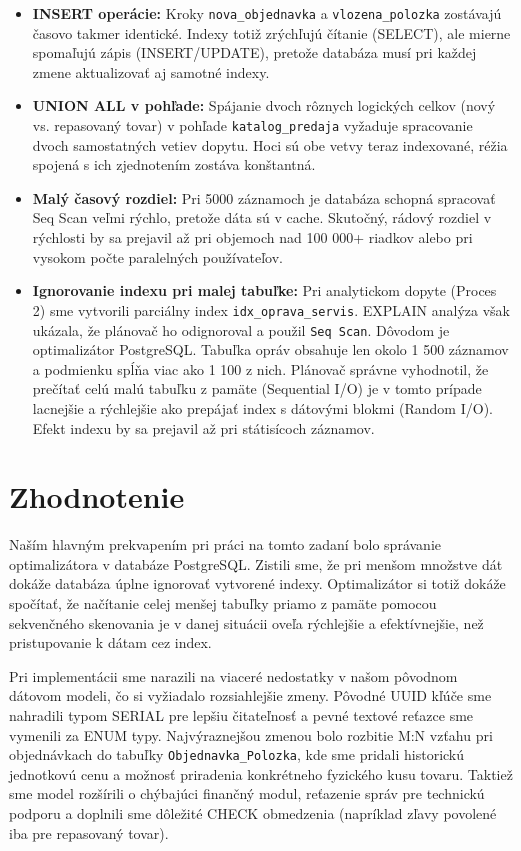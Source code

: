 \documentclass[11pt, a4paper]{article}
\begin{document}
\begin{itemize}
        \item \textbf{INSERT operácie:} Kroky \texttt{nova\_objednavka} a \texttt{vlozena\_polozka} zostávajú časovo takmer identické. Indexy totiž zrýchľujú čítanie (SELECT), ale mierne spomaľujú zápis (INSERT/UPDATE), pretože databáza musí pri každej zmene aktualizovať aj samotné indexy.
        \item \textbf{UNION ALL v pohľade:} Spájanie dvoch rôznych logických celkov (nový vs. repasovaný tovar) v pohľade \texttt{katalog\_predaja} vyžaduje spracovanie dvoch samostatných vetiev dopytu. Hoci sú obe vetvy teraz indexované, réžia spojená s ich zjednotením zostáva konštantná.
        \item \textbf{Malý časový rozdiel:} Pri 5000 záznamoch je databáza schopná spracovať Seq Scan veľmi rýchlo, pretože dáta sú v cache. Skutočný, rádový rozdiel v rýchlosti by sa prejavil až pri objemoch nad 100 000+ riadkov alebo pri vysokom počte paralelných používateľov.
        \item \textbf{Ignorovanie indexu pri malej tabuľke:} Pri analytickom dopyte (Proces 2) sme vytvorili parciálny index \texttt{idx\_oprava\_servis}. EXPLAIN analýza však ukázala, že plánovač ho odignoroval a použil \texttt{Seq Scan}. Dôvodom je optimalizátor PostgreSQL. Tabuľka opráv obsahuje len okolo 1 500 záznamov a podmienku spĺňa viac ako 1 100 z nich. Plánovač správne vyhodnotil, že prečítať celú malú tabuľku z pamäte (Sequential I/O) je v tomto prípade lacnejšie a rýchlejšie ako prepájať index s dátovými blokmi (Random I/O). Efekt indexu by sa prejavil až pri státisícoch záznamov.
\end{itemize}


\newpage
\section{Zhodnotenie}
\label{sec:zhodnotenie}

Naším hlavným prekvapením pri práci na tomto zadaní bolo správanie optimalizátora v databáze PostgreSQL. Zistili sme, že pri menšom množstve dát dokáže databáza úplne ignorovať vytvorené indexy. Optimalizátor si totiž dokáže spočítať, že načítanie celej menšej tabuľky priamo z pamäte pomocou sekvenčného skenovania je v danej situácii oveľa rýchlejšie a efektívnejšie, než pristupovanie k dátam cez index.

Pri implementácii sme narazili na viaceré nedostatky v našom pôvodnom dátovom modeli, čo si vyžiadalo rozsiahlejšie zmeny. Pôvodné UUID kľúče sme nahradili typom SERIAL pre lepšiu čitateľnosť a pevné textové reťazce sme vymenili za ENUM typy. Najvýraznejšou zmenou bolo rozbitie M:N vzťahu pri objednávkach do tabuľky \texttt{Objednavka\_Polozka}, kde sme pridali historickú jednotkovú cenu a možnosť priradenia konkrétneho fyzického kusu tovaru. Taktiež sme model rozšírili o chýbajúci finančný modul, reťazenie správ pre technickú podporu a doplnili sme dôležité CHECK obmedzenia (napríklad zľavy povolené iba pre repasovaný tovar).
\end{document}
